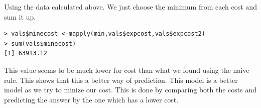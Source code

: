 \documentclass[fontsize=10pt]{scrartcl}
\begin{document}
\begin{enumerate}
		Using the data calculated above. We just choose the minimum from each cost and sum it up.

\begin{verbatim}
> vals$minecost <-mapply(min,vals$expcost,vals$expcost2)
> sum(vals$minecost)
[1] 63913.12
\end{verbatim}

This value seems to be much lower for cost than what we found using the naive rule. This shows that this a better way of prediction. This model is a better model as we try to minize our cost. This is done by comparing both the costs and predicting the answer by the one which has a lower cost.
		\end{enumerate}
		
\end{document}
